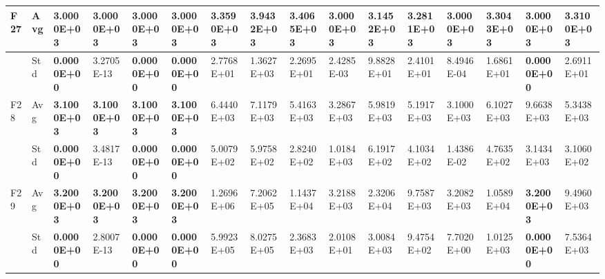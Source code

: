 \documentclass{article} %
\begin{document}
\begin{tabular}{|p{0.3in}|p{0.3in}|p{0.3in}|p{0.3in}|p{0.3in}|p{0.3in}|p{0.3in}|p{0.3in}|p{0.3in}|p{0.3in}|p{0.3in}|p{0.3in}|p{0.3in}|p{0.3in}|p{0.3in}|p{0.5in}|}
F27 & Avg & \textbf{3.0000E+03} & \textbf{3.0000E+03} & \textbf{3.0000E+03} & \textbf{3.0000E+03} & 3.3590E+03 & 3.9432E+03 & 3.4065E+03 & 3.0000E+03 & 3.1452E+03 & 3.2811E+03 & 3.0000E+03 & 3.3043E+03 & \textbf{3.0000E+03} & 3.3100E+03 \\ \hline 
 & Std & \textbf{0.0000E+00} & 3.2705E-13 & \textbf{0.0000E+00} & \textbf{0.0000E+00} & 2.7768E+01 & 1.3627E+03 & 2.2695E+01 & 2.4285E-03 & 9.8828E+01 & 2.4101E+01 & 8.4946E-04 & 1.6861E+01 & \textbf{0.0000E+00} & 2.6911E+01 \\ \hline 
F28 & Avg & \textbf{3.1000E+03} & \textbf{3.1000E+03} & \textbf{3.1000E+03} & \textbf{3.1000E+03} & 6.4440E+03 & 7.1179E+03 & 5.4163E+03 & 3.2867E+03 & 5.9819E+03 & 5.1917E+03 & 3.1000E+03 & 6.1027E+03 & 9.6638E+03 & 5.3438E+03 \\ \hline 
 & Std & \textbf{0.0000E+00} & 3.4817E-13 & \textbf{0.0000E+00} & \textbf{0.0000E+00} & 5.0079E+02 & 5.9758E+02 & 2.8240E+02 & 1.0184E+03 & 6.1917E+02 & 4.1034E+02 & 1.4386E-02 & 4.7635E+02 & 3.1434E+03 & 3.1060E+02 \\ \hline 
F29 & Avg & \textbf{3.2000E+03} & \textbf{3.2000E+03} & \textbf{3.2000E+03} & \textbf{3.2000E+03} & 1.2696E+06 & 7.2062E+05 & 1.1437E+04 & 3.2188E+03 & 2.3206E+04 & 9.7587E+03 & 3.2082E+03 & 1.0589E+04 & \textbf{3.2000E+03} & 9.4960E+03 \\ \hline 
 & Std & \textbf{0.0000E+00} & 2.8007E-13 & \textbf{0.0000E+00} & \textbf{0.0000E+00} & 5.9923E+05 & 8.0275E+05 & 2.3683E+03 & 2.0108E+01 & 3.0084E+03 & 9.4754E+02 & 7.7020E+00 & 1.0125E+03 & \textbf{0.0000E+00} & 7.5364E+03 \\ \hline 
\end{tabular}



\noindent 
\end{document}
